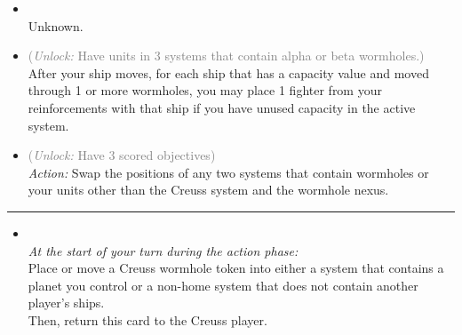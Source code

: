 \begin{multicols}{2}

\begin{itemize}
\item {}\\
Unknown.
\item {} \textcolor{gray}{(\emph{Unlock:} Have units in 3 systems that contain alpha or beta wormholes.)}
After your ship moves, for each ship that has a capacity value and moved through 1 or more wormholes, you may place 1 fighter from your reinforcements with that ship if you have unused capacity in the active system. 
\item {} \textcolor{gray}{(\emph{Unlock:} Have 3 scored objectives)}\\
\emph{Action:} Swap the positions of any two systems that contain wormholes or your units other than the Creuss system and the wormhole nexus.
\end{itemize}

\vspace{-10pt}\rule{\hsize}{0.4pt}\vspace{5pt}


\begin{itemize}
\item {}\\
\emph{At the start of your turn during the action phase:}\\
Place or move a Creuss wormhole token into either a system that contains a planet you control or a non-home system that does not contain another player's ships.\\
Then, return this card to the Creuss player.
\end{itemize}

\end{multicols}



